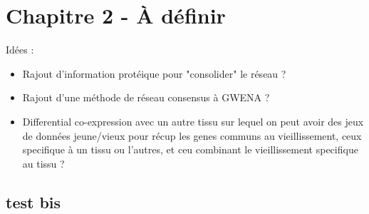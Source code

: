 \setcounter{chapter}{3}
\chapter*{Chapitre 2 - À définir}

Idées :
\begin{itemize}
    \item Rajout d'information protéique pour "consolider" le réseau ?
    \item Rajout d'une méthode de réseau consensus à GWENA ?
    \item Differential co-expression avec un autre tissu sur lequel on peut avoir des jeux de données jeune/vieux pour récup les genes communs au vieillissement, ceux specifique à un tissu ou l'autres, et ceu combinant le vieillissement specifique au tissu ?
\end{itemize}

\section{test bis}

